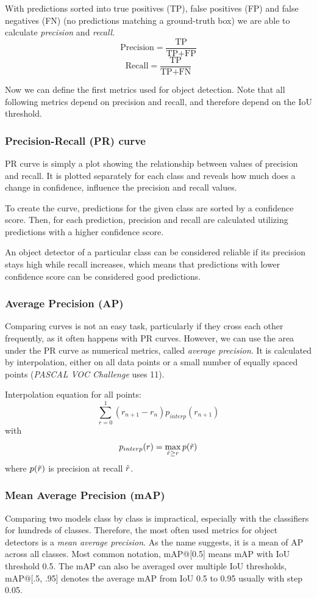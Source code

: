 With predictions sorted into true positives (TP), false positives (FP) and false negatives (FN) (no predictions matching a ground-truth box) we are able to calculate \textit{precision} and \textit{recall}.
$$\text{Precision} = \frac{\text{TP}}{\text{TP}+\text{FP}}$$
$$\text{Recall} = \frac{\text{TP}}{\text{TP}+\text{FN}}$$

Now we can define the first metrics used for object detection. Note that all following metrics depend on precision and recall, and therefore depend on the IoU threshold.

\subsubsection{Precision-Recall (PR) curve}
PR curve is simply a plot showing the relationship between values of precision and recall. It is plotted separately for each class and reveals how much does a change in confidence, influence the precision and recall values. 

To create the curve, predictions for the given class are sorted by a confidence score. Then, for each prediction, precision and recall are calculated utilizing predictions with a higher confidence score. 

An object detector of a particular class can be considered reliable if its precision stays high while recall increases, which means that predictions with lower confidence score can be considered good predictions.

\subsubsection{Average Precision (AP)}
Comparing curves is not an easy task, particularly if they cross each other frequently, as it often happens with PR curves. However, we can use the area under the PR curve as numerical metrics, called \textit{average precision}. It is calculated by interpolation, either on all data points or a small number of equally spaced points (\textit{PASCAL VOC Challenge} uses 11).

Interpolation equation for all points:
$$\sum_{r=0}^1 (r_{n+1} - r_n ) p_{interp}(r_{n+1})$$
with
$$p_{interp}(r) = \max_{\Tilde{r} \geq r} p(\Tilde{r})$$
where $p(\Tilde{r})$ is precision at recall $\Tilde{r}$.

\subsubsection{Mean Average Precision (mAP)}
Comparing two models class by class is impractical, especially with the classifiers for hundreds of classes. Therefore, the most often used metrics for object detectors is a \textit{mean average precision}. As the name suggests, it is a mean of AP across all classes. Most common notation, mAP@[0.5] means mAP with IoU threshold 0.5. The mAP can also be averaged over multiple IoU thresholds, mAP@[.5, .95] denotes the average mAP from IoU 0.5 to 0.95 usually with step 0.05.

